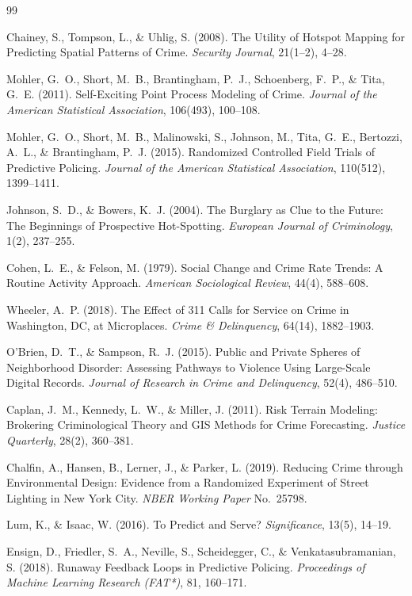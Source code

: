 \documentclass[11pt,a4paper]{article}
\begin{document}
\begin{thebibliography}{99}

Chainey, S., Tompson, L., \& Uhlig, S. (2008).
The Utility of Hotspot Mapping for Predicting Spatial Patterns of Crime.
\emph{Security Journal}, 21(1--2), 4--28.

Mohler, G.~O., Short, M.~B., Brantingham, P.~J., Schoenberg, F.~P.,
\& Tita, G.~E. (2011).
Self-Exciting Point Process Modeling of Crime.
\emph{Journal of the American Statistical Association}, 106(493), 100--108.

Mohler, G.~O., Short, M.~B., Malinowski, S., Johnson, M., Tita, G.~E.,
Bertozzi, A.~L., \& Brantingham, P.~J. (2015).
Randomized Controlled Field Trials of Predictive Policing.
\emph{Journal of the American Statistical Association}, 110(512), 1399--1411.

Johnson, S.~D., \& Bowers, K.~J. (2004).
The Burglary as Clue to the Future: The Beginnings of Prospective
Hot-Spotting. \emph{European Journal of Criminology}, 1(2), 237--255.

Cohen, L.~E., \& Felson, M. (1979).
Social Change and Crime Rate Trends: A Routine Activity Approach.
\emph{American Sociological Review}, 44(4), 588--608.

Wheeler, A.~P. (2018).
The Effect of 311 Calls for Service on Crime in Washington, DC, at
Microplaces. \emph{Crime \& Delinquency}, 64(14), 1882--1903.

O'Brien, D.~T., \& Sampson, R.~J. (2015).
Public and Private Spheres of Neighborhood Disorder: Assessing
Pathways to Violence Using Large-Scale Digital Records.
\emph{Journal of Research in Crime and Delinquency}, 52(4), 486--510.

Caplan, J.~M., Kennedy, L.~W., \& Miller, J. (2011).
Risk Terrain Modeling: Brokering Criminological Theory and GIS Methods
for Crime Forecasting. \emph{Justice Quarterly}, 28(2), 360--381.

Chalfin, A., Hansen, B., Lerner, J., \& Parker, L. (2019).
Reducing Crime through Environmental Design: Evidence from a
Randomized Experiment of Street Lighting in New York City.
\emph{NBER Working Paper} No.\ 25798.

Lum, K., \& Isaac, W. (2016).
To Predict and Serve? \emph{Significance}, 13(5), 14--19.

Ensign, D., Friedler, S.~A., Neville, S., Scheidegger, C.,
\& Venkatasubramanian, S. (2018).
Runaway Feedback Loops in Predictive Policing.
\emph{Proceedings of Machine Learning Research (FAT*)}, 81, 160--171.

\end{thebibliography}
\end{document}
